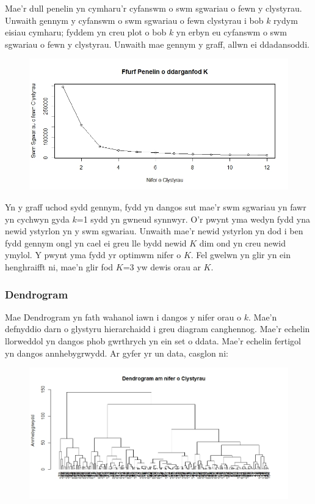 Mae'r dull penelin yn cymharu'r cyfanswm o swm sgwariau o fewn y clystyrau. Unwaith gennym y cyfanswm o swm sgwariau o fewn clystyrau i bob $k$ rydym eisiau cymharu; fyddem yn creu plot o bob $k$ yn erbyn eu cyfanswm o swm sgwariau o fewn y clystyrau. Unwaith mae gennym y graff, allwn ei ddadansoddi. 

\begin{figure}[H]
\begin{center}
\includegraphics[width=0.5\linewidth]{../img/Dull_Penelin.jpeg}
\end{center}
\end{figure}

Yn y graff uchod sydd gennym, fydd yn dangos sut mae'r swm sgwariau yn fawr yn cychwyn gyda $k$=1 sydd yn gwneud synnwyr. O'r pwynt yma wedyn fydd yna newid ystyrlon yn y swm sgwariau. Unwaith mae'r newid ystyrlon yn dod i ben fydd gennym ongl yn cael ei greu lle bydd newid $K$ dim ond yn creu newid ymylol. Y pwynt yma fydd yr optimwm nifer o $K$. Fel gwelwn yn glir yn ein henghraifft ni, mae'n glir fod $K$=3 yw dewis orau ar $K$.

\subsubsection{Dendrogram}

Mae Dendrogram yn fath wahanol iawn i dangos y nifer orau o $k$. Mae'n defnyddio darn o glystyru hierarchaidd i greu diagram canghennog. Mae'r echelin llorweddol yn dangos phob gwrthrych yn ein set o ddata. Mae'r echelin fertigol yn dangos annhebygrwydd. Ar gyfer yr un data, casglon ni:

\begin{figure}[H]
\begin{center}
\includegraphics[width=0.5\linewidth]{../img/Dendrogram.jpeg}
\end{center}
\end{figure}

